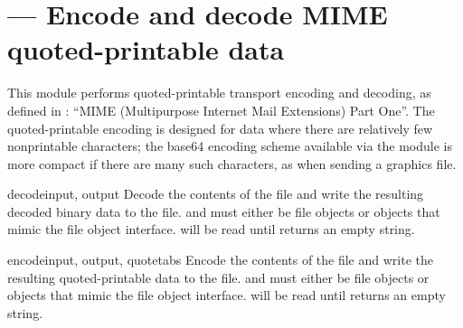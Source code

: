 \section{ ---
         Encode and decode MIME quoted-printable data}



This module performs quoted-printable transport encoding and decoding,
as defined in : ``MIME (Multipurpose Internet Mail Extensions)
Part One''.  The quoted-printable encoding is designed for data where
there are relatively few nonprintable characters; the base64 encoding
scheme available via the  module is more compact if there
are many such characters, as when sending a graphics file.


\begin{funcdesc}{decode}{input, output}
Decode the contents of the  file and write the resulting
decoded binary data to the  file.
 and  must either be file objects or objects that
mimic the file object interface.  will be read until
 returns an empty string.
\end{funcdesc}

\begin{funcdesc}{encode}{input, output, quotetabs}
Encode the contents of the  file and write the resulting
quoted-printable data to the  file.
 and  must either be file objects or objects that
mimic the file object interface.  will be read until
 returns an empty string.
\end{funcdesc}



